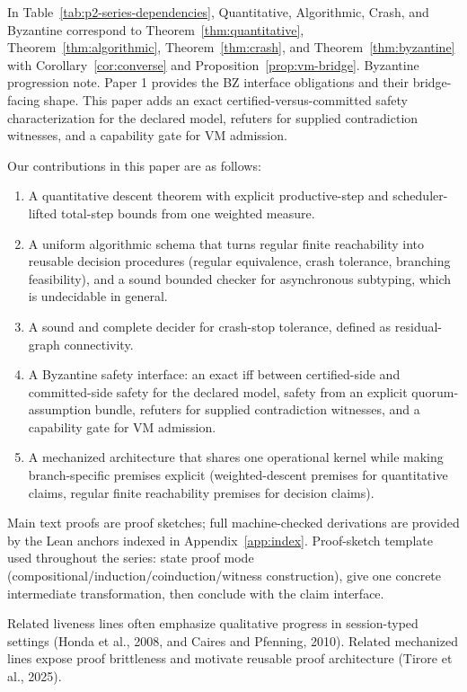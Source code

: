 \documentclass[a4paper,10pt,twocolumn,english]{article}
\numberwithin{equation}{section}
\theoremstyle{paperdef}
\theoremstyle{paperplain}
\theoremstyle{paperdef}
\theoremstyle{paperremark}
\begin{document}
In Table~\ref{tab:p2-series-dependencies}, Quantitative, Algorithmic, Crash, and Byzantine correspond to Theorem~\ref{thm:quantitative}, Theorem~\ref{thm:algorithmic}, Theorem~\ref{thm:crash}, and Theorem~\ref{thm:byzantine} with Corollary~\ref{cor:converse} and Proposition~\ref{prop:vm-bridge}.
Byzantine progression note. Paper 1 provides the BZ interface obligations and
their bridge-facing shape. This paper adds an exact certified-versus-committed safety
characterization for the declared model, refuters for supplied contradiction
witnesses, and a capability gate for VM admission.

Our contributions in this paper are as follows:
\begin{enumerate}
	\item A quantitative descent theorem with explicit productive-step and scheduler-lifted total-step bounds from one weighted measure.
	\item A uniform algorithmic schema that turns regular finite reachability into reusable decision procedures (regular equivalence, crash tolerance, branching feasibility), and a sound bounded checker for asynchronous subtyping, which is undecidable in general.
	\item A sound and complete decider for crash-stop tolerance, defined as residual-graph connectivity.
	\item A Byzantine safety interface: an exact iff between certified-side and committed-side safety for the declared model, safety from an explicit quorum-assumption bundle, refuters for supplied contradiction witnesses, and a capability gate for VM admission.
	\item A mechanized architecture that shares one operational kernel while making branch-specific premises explicit (weighted-descent premises for quantitative claims, regular finite reachability premises for decision claims).
\end{enumerate}

Main text proofs are proof sketches; full machine-checked derivations are provided by the Lean anchors indexed in Appendix~\ref{app:index}.
Proof-sketch template used throughout the series: state proof mode
(compositional/induction/coinduction/witness construction), give one concrete
intermediate transformation, then conclude with the claim interface.

Related liveness lines often emphasize qualitative progress in session-typed settings (Honda et al., 2008, and Caires and Pfenning, 2010). Related mechanized lines expose proof brittleness and motivate reusable proof architecture (Tirore et al., 2025).
\end{document}
